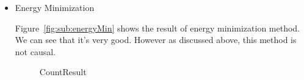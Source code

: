 \documentclass[a4paper]{article}
\begin{document}
\begin{enumerate}
\begin{itemize}
\item Energy Minimization

Figure~\ref{fig:sub:energyMin} shows the result of energy minimization method. We can see that it's very good. However as discussed above, this method is not causal.

\begin{figure}[htb]
    \begin{center}
    \end{center}
    \caption{CountResult}
    \label{fig:CountResult}
\end{figure}


\end{itemize}
\end{enumerate}
\end{document}
